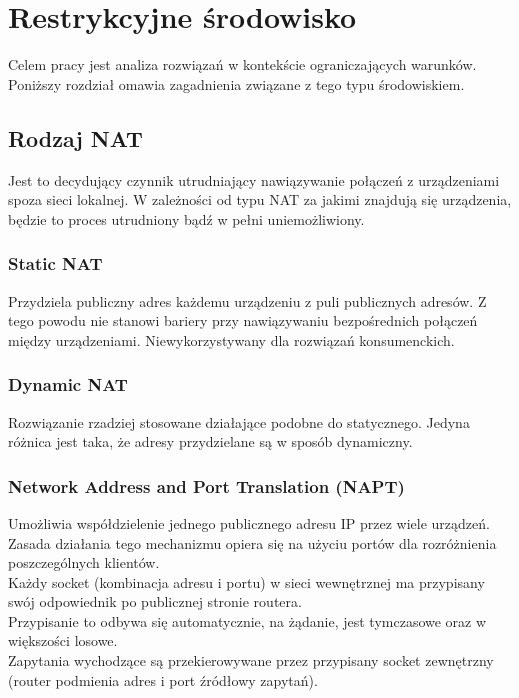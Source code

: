 \section{Restrykcyjne środowisko}
Celem pracy jest analiza rozwiązań w kontekście ograniczających warunków. Poniższy rozdział omawia zagadnienia związane z tego typu środowiskiem.

\subsection{Rodzaj NAT}
Jest to decydujący czynnik utrudniający nawiązywanie połączeń z urządzeniami spoza sieci lokalnej. W zależności od typu NAT za jakimi znajdują się urządzenia, będzie to proces utrudniony bądź w pełni uniemożliwiony.

\subsubsection{Static NAT}
Przydziela publiczny adres każdemu urządzeniu z puli publicznych adresów. Z tego powodu nie stanowi bariery przy nawiązywaniu bezpośrednich połączeń między urządzeniami. Niewykorzystywany dla rozwiązań konsumenckich.

\subsubsection{Dynamic NAT}
Rozwiązanie rzadziej stosowane działające podobne do statycznego. Jedyna różnica jest taka, że adresy przydzielane są w sposób dynamiczny.

\newpage

\subsubsection{Network Address and Port Translation (NAPT)}
Umożliwia współdzielenie jednego publicznego adresu IP przez wiele urządzeń. Zasada działania tego mechanizmu opiera się na użyciu portów dla rozróżnienia poszczególnych klientów.\\

Każdy socket (kombinacja adresu i portu) w sieci wewnętrznej ma przypisany swój odpowiednik po publicznej stronie routera.\\

Przypisanie to odbywa się automatycznie, na żądanie, jest tymczasowe oraz w większości losowe.\\

Zapytania wychodzące są przekierowywane przez przypisany socket zewnętrzny (router podmienia adres i port źródłowy zapytań).\\

